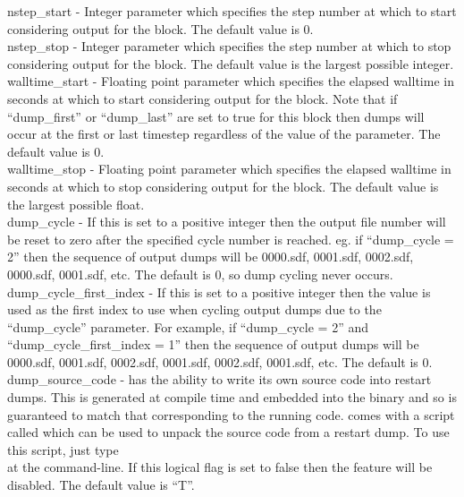 {\emphtext nstep\_start} - Integer parameter which specifies the
  step number at which to start considering output for the block.
  The default value is 0.\\

{\emphtext nstep\_stop} - Integer parameter which specifies the
  step number at which to stop considering output for the block.
  The default value is the largest possible integer.\\

{\emphtext walltime\_start} - Floating point parameter which specifies the
  elapsed walltime in seconds at which to start considering output for the
  block. Note
  that if ``dump\_first'' or ``dump\_last'' are set to true for this block then
  dumps will occur at the first or last timestep regardless of the value of
  the 
  parameter.
  The default value is 0.\\

{\emphtext walltime\_stop} - Floating point parameter which specifies the
  elapsed walltime in seconds at which to stop considering output for the
  block. The default value is the largest possible float.\\

{\emphtext dump\_cycle} - If this is set to a positive integer then the
  output file number will be reset to zero after the specified cycle number
  is reached. eg. if ``dump\_cycle = 2'' then the sequence of output dumps
  will be 0000.sdf, 0001.sdf, 0002.sdf, 0000.sdf, 0001.sdf, etc.
  The default is 0, so dump cycling never occurs.\\

{\emphtext dump\_cycle\_first\_index} - If this is set to a positive integer
  then the value is used as the first index to use when cycling output dumps
  due to the ``dump\_cycle'' parameter. For example, if ``dump\_cycle = 2''
  and ``dump\_cycle\_first\_index = 1'' then the sequence of output dumps
  will be 0000.sdf, 0001.sdf, 0002.sdf, 0001.sdf, 0002.sdf, 0001.sdf, etc.
  The default is 0.\\

{\emphtext dump\_source\_code} - {\EPOCH} has the ability to write its own
source code into restart dumps. This is generated at compile time and embedded
into the binary and so is guaranteed to match that corresponding to the running
code. {\EPOCH} comes with a script called
 which can be used to unpack the
source code from a restart dump. To use this script, just type
\indent{}\\
at the command-line.
If this logical flag is set to false then
the feature will be disabled. The default value is ``T''.\\

